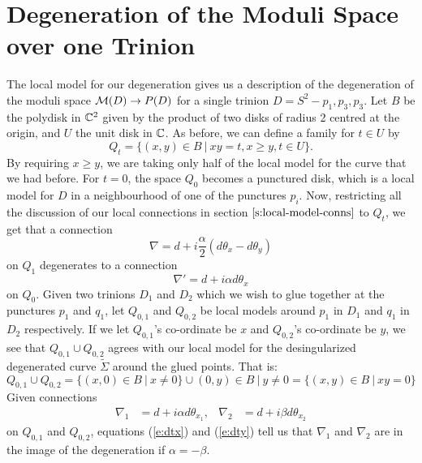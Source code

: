 	\section{Degeneration of the Moduli Space over one Trinion}
	The local model for our degeneration gives us a description of the degeneration of the moduli space $\mathcal{M}(D) \to P(D)$ for a single trinion $D = S^2 - {p_1,p_3,p_3}$. Let $B$ be the polydisk in $\mathbb{C}^2$ given by the product of two disks of radius 2 centred at the origin, and $U$ the unit disk in $\mathbb{C}$. As before, we can define a family for $t\in U$ by
	\begin{equation}
		Q_t = \{(x,y)\in B ~|~ xy = t, x\geq y, t\in U\}.
	\end{equation}
	By requiring $x\geq y$, we are taking only half of the local model for the curve that we had before. For $t=0$, the space $Q_0$ becomes a punctured disk, which is a local model for $D$ in a neighbourhood of one of the punctures $p_i$. Now, restricting all the discussion of our local connections in section $\ref{s:local-model-conns}$ to $Q_t$, we get that a connection
	\begin{equation}
		\nabla = d + i\frac{\alpha}{2}(d\theta_x - d\theta_y)
	\end{equation}
	on $Q_1$ degenerates to a connection
	\begin{equation}
		\nabla' = d + i\alpha d\theta_x
	\end{equation}
	on $Q_0$. Given two trinions $D_1$ and $D_2$ which we wish to glue together at the punctures $p_1$ and $q_1$, let $Q_{0,1}$ and $Q_{0,2}$ be local models around $p_1$ in $D_1$ and $q_1$ in $D_2$ respectively. If we let $Q_{0,1}$'s co-ordinate be $x$ and $Q_{0,2}$'s co-ordinate be $y$, we see that $Q_{0,1}\cup Q_{0,2}$ agrees with our local model for the desingularized degenerated curve $\tilde{\Sigma}$ around the glued points. That is:
	\begin{equation}
		Q_{0,1}\cup Q_{0,2} = \{(x,0)\in B~|~ x\neq 0 \}\cup {(0,y)\in B~|~ y\neq 0} = \{(x,y)\in B~|~ xy=0\} 
	\end{equation}
	Given connections
	\begin{align*}
		\nabla_1 &= d + i\alpha d\theta_{x_1}, & \nabla_2 &= d + i\beta d\theta_{x_2}
	\end{align*} 
	on $Q_{0,1}$ and $Q_{0,2}$, equations (\ref{e:dtx}) and (\ref{e:dty}) tell us that $\nabla_1$ and $\nabla_2$ are in the image of the degeneration if $\alpha = -\beta$. 